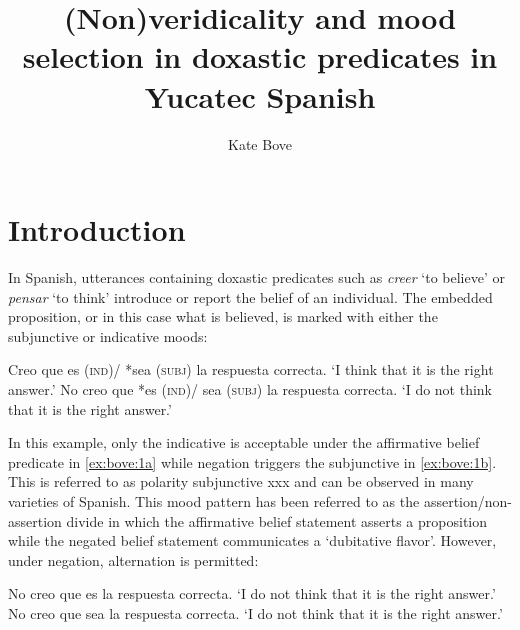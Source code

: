 \documentclass[output=paper,colorlinks,citecolor=brown,
]{langscibook}
\author{Kate Bove\affiliation{New Mexico State University}}
\title{(Non)veridicality and mood selection in doxastic predicates in Yucatec Spanish}
\begin{document}
\maketitle

\section{Introduction}

In Spanish, utterances containing doxastic predicates such as \textit{creer} `to believe' or \textit{pensar }`to think' introduce or report the belief of an individual. The embedded proposition, or in this case what is believed, is marked with either the subjunctive or indicative moods:

\begin{exe} %
    \ex\label{ex:bove:1} 
    \begin{xlist} %
        \ex \label{ex:bove:1a}
          Creo que es (\textsc{ind})/ *sea (\textsc{subj})  la respuesta correcta.   %
            \glt `I think that it is the right answer.'
        \ex\label{ex:bove:1b}
            No creo que *es (\textsc{ind})/ sea (\textsc{subj})  la respuesta correcta.
            \glt `I do not think that it is the right answer.'
\end{xlist}
\end{exe}

In this example, only the indicative is acceptable under the affirmative belief predicate in \ref{ex:bove:1a} while negation triggers the subjunctive in \ref{ex:bove:1b}. This is referred to as polarity subjunctive xxx and can be observed in many varieties of Spanish. This mood pattern has been referred to as the assertion/non-assertion divide  in which the affirmative belief statement asserts a proposition while the negated belief statement communicates a 
`dubitative flavor'. However, under negation, alternation is permitted:


\begin{exe} %
    \ex\label{ex:bove:2} 
    \begin{xlist} %
        \ex \label{ex:bove:2a}
          No creo que es la respuesta correcta.   %
                   \glt `I do not think that it is the right answer.'
        \ex\label{ex:bove:2b}
           No creo que sea la respuesta correcta.
                   \glt `I do not think that it is the right answer.'
\end{xlist}
\end{exe}
\end{document}
